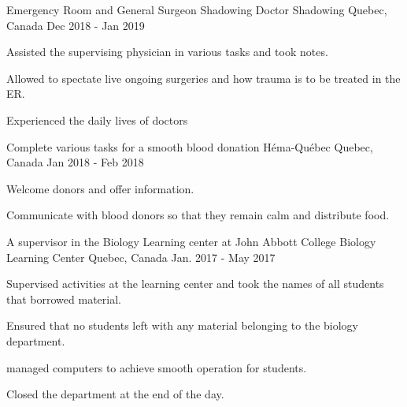 
\begin{cventries}
\cventry
    {Emergency Room and General Surgeon Shadowing}
    {Doctor Shadowing}
    {Quebec, Canada}
    {Dec 2018 - Jan 2019}
    {
      \begin{cvitems}
        \item {Assisted the supervising physician in various tasks and took notes.}
        \item {Allowed to spectate live ongoing surgeries and how trauma is to be treated in the ER.}
        \item {Experienced the daily lives of doctors}
      \end{cvitems}
    }
\cventry
    {Complete various tasks for a smooth blood donation}
    {Héma-Québec}
    {Quebec, Canada}
    {Jan 2018 - Feb 2018}
    {
      \begin{cvitems}
        \item {Welcome donors and offer information.}
        \item {Communicate with blood donors so that they remain calm and distribute food.}
      \end{cvitems}
    }
  \cventry
    {A supervisor in the Biology Learning center at John Abbott College}
    {Biology Learning Center}
    {Quebec, Canada}
    {Jan. 2017 - May 2017}
    {
      \begin{cvitems}
        \item {Supervised activities at the learning center and took the names of all students that borrowed material.}
        \item {Ensured that no students left with any material belonging to the biology department.}
        \item {managed computers to achieve smooth operation for students.}
        \item {Closed the department at the end of the day.}
      \end{cvitems}
    }
    \end{cventries}
